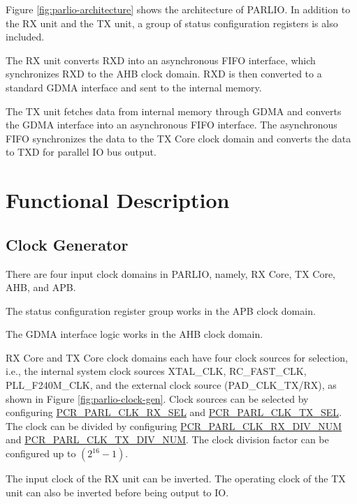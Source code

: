 \documentclass[main\_\_EN.tex]{subfiles}
\begin{document}
Figure \ref{fig:parlio-architecture} shows the architecture of PARLIO. In addition to the RX unit and the TX unit, a group of status configuration registers is also included.

The RX unit converts RXD into an asynchronous FIFO interface, which synchronizes RXD to the AHB clock domain. RXD is then converted to a standard GDMA interface and sent to the internal memory.

The TX unit fetches data from internal memory through GDMA and converts the GDMA interface into an asynchronous FIFO interface. The asynchronous FIFO synchronizes the data to the TX Core clock domain and converts the data to TXD for parallel IO bus output.



\section{Functional Description}
\label{sec:parlio-func-descr}

\subsection{Clock Generator}
\label{subsec:PARLIO-clock_cfg}

There are four input clock domains in PARLIO, namely, RX Core, TX Core, AHB, and APB. 

The status configuration register group works in the APB clock domain.

The GDMA interface logic works in the AHB clock domain.

RX Core and TX Core clock domains each have four clock sources for selection, i.e., the internal system clock sources XTAL\_CLK, RC\_FAST\_CLK, PLL\_F240M\_CLK, and the external clock source (PAD\_CLK\_TX/RX), as shown in Figure \ref{fig:parlio-clock-gen}. Clock sources can be selected by configuring \hyperref[fielddesc:PCRPARLCLKRXSEL]{PCR\_PARL\_CLK\_RX\_SEL} and \hyperref[fielddesc:PCRPARLCLKTXSEL]{PCR\_PARL\_CLK\_TX\_SEL}. The clock can be divided by configuring \hyperref[fielddesc:PCRPARLCLKRXDIVNUM]{PCR\_PARL\_CLK\_RX\_DIV\_NUM} and \hyperref[fielddesc:PCRPARLCLKTXDIVNUM]{PCR\_PARL\_CLK\_TX\_DIV\_NUM}. The clock division factor can be configured up to \begin{math} (2^{16}-1) \end{math}.

The input clock of the RX unit can be inverted. The operating clock of the TX unit can also be inverted before being output to IO.
\end{document}
